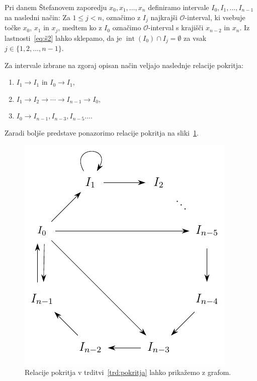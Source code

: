 \documentclass[mat2]{fmfdelo}
\DeclareMathOperator{\interior}{int}
\begin{document}
Pri danem Štefanovem zaporedju $x_0, x_1, \dots, x_n$ definiramo intervale $I_0, I_1, \dots, I_{n-1}$ na  nasledni način: Za $1 \leq j < n$, označimo z $I_j$ najkrajši $\mathcal{O}$-interval, ki vsebuje točke $x_0$, $x_1$ in $x_j$, medtem ko z $I_0$ označimo $\mathcal{O}$-interval s krajišči $x_{n-2}$ in $x_n$. Iz lastnosti~\ref{eq:š2} lahko sklepamo, da je $\interior(I_0) \cap I_j = \emptyset$ za vsak $j \in \{1, 2, \dots, n-1\}$.

\begin{trditev}\label{trd:pokritja}
Za intervale izbrane na zgoraj opisan način veljajo naslednje relacije pokritja:
\begin{enumerate}
\item $I_1 \to I_1$ in $I_0 \to I_1$,\label{trd:pokritja1}
\item $I_1 \to I_2 \to \cdots \to I_{n-1} \to I_0$,\label{trd:pokritja3}
\item $I_0 \to I_{n-1}, I_{n-3}, I_{n-5} \dots $.\label{trd:pokritja2}
\end{enumerate}
Zaradi boljše predstave ponazorimo relacije pokritja na sliki~\ref{fig:nkotnik}.
\end{trditev}

\begin{figure}[h]
  \centering
  \includegraphics{images/graph_n.pdf}
  \caption[Primer vektorske slike.]{Relacije pokritja v trditvi~\ref{trd:pokritja} lahko prikažemo z grafom.}
  \label{fig:nkotnik}
\end{figure}
\end{document}
